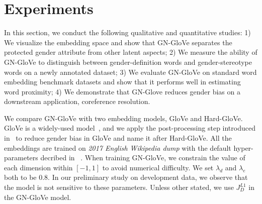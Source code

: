 \section{Experiments}
\label{sec:experiments}

In this section, we conduct the following qualitative and quantitative studies: 1) We visualize the embedding space and show that GN-GloVe separates the protected gender attribute from other latent aspects; 2) We measure the ability of GN-GloVe to distinguish between gender-definition words and gender-stereotype words on a newly annotated dataset;  3) We evaluate GN-GloVe on standard word embedding benchmark datasets and show that it performs well in estimating word proximity; 4) We demonstrate that GN-Glove reduces gender bias on a downstream application, coreference resolution.

We compare GN-GloVe with two embedding models, GloVe and Hard-GloVe. GloVe is a widely-used model~\cite{glove}, and we apply the post-processing step introduced in~\cite{kaiwei} to reduce gender bias in GloVe and name it after Hard-GloVe.
All the  embeddings are trained on \textit{2017 English Wikipedia dump} with the default hyper-parameters decribed in ~\cite{glove}.
When training GN-GloVe, we constrain the value of each dimension within $[-1, 1]$ to avoid numerical difficulty.
We set $\lambda_d$ and $\lambda_e$ both to be 0.8. In our preliminary study on development data, we observe that the model is not sensitive to these parameters. 
Unless other stated, we use $J_D^{L1}$ in the GN-GloVe model.


